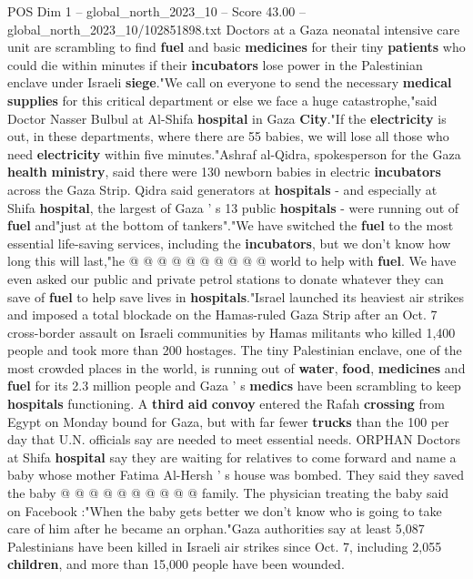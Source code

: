 \begin{textsample}{POS Dim 1 – global\_north\_2023\_10 – Score 43.00 – global\_north\_2023\_10/102851898.txt}  \label{ex:f1_pos_318}
Doctors at a Gaza neonatal intensive care unit are scrambling to find \textbf{fuel} and basic \textbf{medicines} for their tiny \textbf{patients} who could die within minutes if their \textbf{incubators} lose power in the Palestinian enclave under Israeli \textbf{siege}."We call on everyone to send the necessary \textbf{medical} \textbf{supplies} for this critical department or else we face a huge catastrophe,"said Doctor Nasser Bulbul at Al-Shifa \textbf{hospital} in Gaza \textbf{City}."If the \textbf{electricity} is out, in these departments, where there are 55 babies, we will lose all those who need \textbf{electricity} within five minutes."Ashraf al-Qidra, spokesperson for the Gaza \textbf{health} \textbf{ministry}, said there were 130 newborn babies in electric \textbf{incubators} across the Gaza Strip.
Qidra said generators at \textbf{hospitals} - and especially at Shifa \textbf{hospital}, the largest of Gaza ' s 13 public \textbf{hospitals} - were running out of \textbf{fuel} and"just at the bottom of tankers"."We have switched the \textbf{fuel} to the most essential life-saving services, including the \textbf{incubators}, but we don't know how long this will last,"he @ @ @ @ @ @ @ @ @ @ world to help with \textbf{fuel}.
We have even asked our public and private petrol stations to donate whatever they can save of \textbf{fuel} to help save lives in \textbf{hospitals}."Israel launched its heaviest air strikes and imposed a total blockade on the Hamas-ruled Gaza Strip after an Oct. 7 cross-border assault on Israeli communities by Hamas militants who killed 1,400 people and took more than 200 hostages.
The tiny Palestinian enclave, one of the most crowded places in the world, is running out of \textbf{water}, \textbf{food}, \textbf{medicines} and \textbf{fuel} for its 2.3 million people and Gaza ' s \textbf{medics} have been scrambling to keep \textbf{hospitals} functioning.
A \textbf{third} \textbf{aid} \textbf{convoy} entered the Rafah \textbf{crossing} from Egypt on Monday bound for Gaza, but with far fewer \textbf{trucks} than the 100 per day that U.N. officials say are needed to meet essential needs.
ORPHAN Doctors at Shifa \textbf{hospital} say they are waiting for relatives to come forward and name a baby whose mother Fatima Al-Hersh ' s house was bombed.
They said they saved the baby @ @ @ @ @ @ @ @ @ @ family.
The physician treating the baby said on Facebook :"When the baby gets better we don't know who is going to take care of him after he became an orphan."Gaza authorities say at least 5,087 Palestinians have been killed in Israeli air strikes since Oct. 7, including 2,055 \textbf{children}, and more than 15,000 people have been wounded.

\end{textsample}
